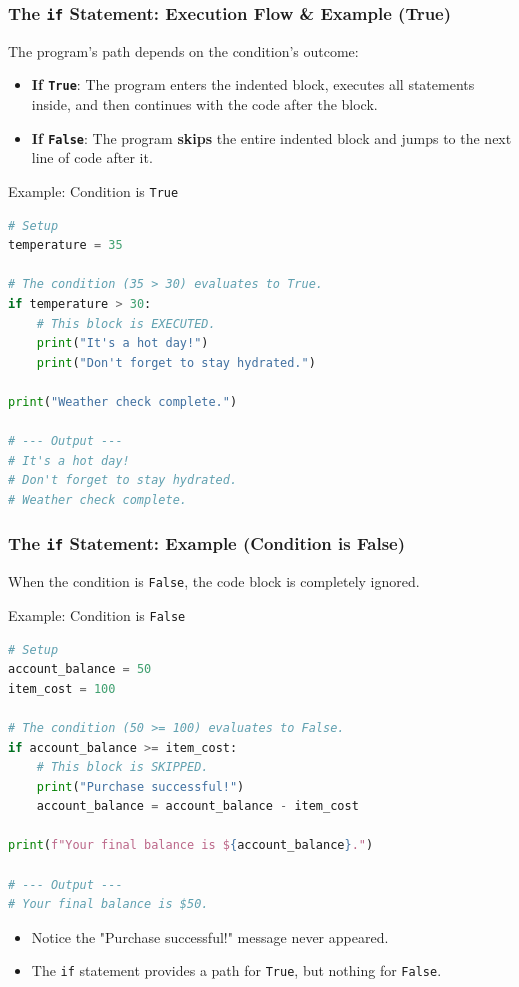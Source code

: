 \documentclass{beamer}
\begin{document}
\begin{frame}[fragile]
    \frametitle{The \texttt{if} Statement: Execution Flow \& Example (True)}
    
    The program's path depends on the condition's outcome:
    \begin{itemize}
        \item \textbf{If \texttt{True}}: The program enters the indented block, executes all statements inside, and then continues with the code after the block.
        \item \textbf{If \texttt{False}}: The program \textbf{skips} the entire indented block and jumps to the next line of code after it.
    \end{itemize}
    
    \begin{block}{Example: Condition is \texttt{True}}
        \begin{lstlisting}[language=Python]
# Setup
temperature = 35

# The condition (35 > 30) evaluates to True.
if temperature > 30:
    # This block is EXECUTED.
    print("It's a hot day!")
    print("Don't forget to stay hydrated.")

print("Weather check complete.")

# --- Output ---
# It's a hot day!
# Don't forget to stay hydrated.
# Weather check complete.
        \end{lstlisting}
    \end{block}
\end{frame}

\begin{frame}[fragile]
    \frametitle{The \texttt{if} Statement: Example (Condition is False)}
    
    When the condition is \texttt{False}, the code block is completely ignored.
    
    \begin{block}{Example: Condition is \texttt{False}}
        \begin{lstlisting}[language=Python]
# Setup
account_balance = 50
item_cost = 100

# The condition (50 >= 100) evaluates to False.
if account_balance >= item_cost:
    # This block is SKIPPED.
    print("Purchase successful!")
    account_balance = account_balance - item_cost

print(f"Your final balance is ${account_balance}.")

# --- Output ---
# Your final balance is $50.
        \end{lstlisting}
    \end{block}
    \begin{itemize}
        \item Notice the "Purchase successful!" message never appeared.
        \item The \texttt{if} statement provides a path for \texttt{True}, but nothing for \texttt{False}.
    \end{itemize}
\end{frame}
\end{document}
